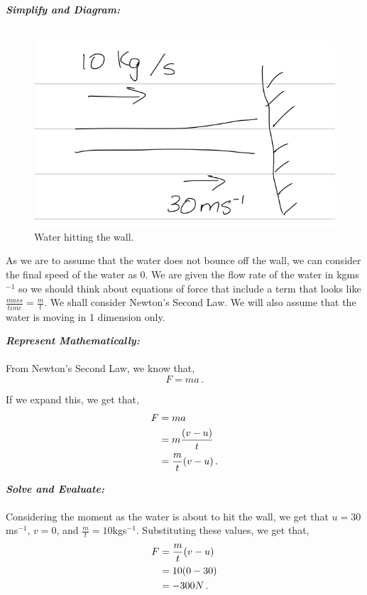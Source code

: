 \begin{subquestions}
\textbf{\textit{Simplify and Diagram:}} \\ \\
\begin{figure}[H]
	\begin{center}
		\includegraphics[scale=0.25]{../2015/figures/2015q6-1}
		\caption{\label{2015:q6:fig:Diagram1} Water hitting the wall.}
	\end{center}
\end{figure}	
As we are to assume that the water does not bounce off the wall, we can consider the final speed of the water as 0. We are given the flow rate of the water in kgms$^{-1}$ so we should think about equations of force that include a term that looks like $\frac{mass}{time}=\frac{m}{t}$. We shall consider Newton's Second Law. We will also assume that the water is moving in 1 dimension only.
	
	
	
	
\textbf{\textit{Represent Mathematically:}} \\ \\
From Newton's Second Law, we know that,
\begin{equation}
	F=ma \,.
\end{equation}
	
If we expand this, we get that,
\begin{align}
	F & = ma \nonumber \\
	  & = m\frac{(v-u)}{t} \nonumber \\
	  & = \frac{m}{t}(v-u) \,.
\end{align}
	
	
	
	
\textbf{\textit{Solve and Evaluate:}} \\ \\
Considering the moment as the water is about to hit the wall, we get that $u=30$ms$^{-1}$, $v=0$, and $\frac{m}{t}=10$kgs$^{-1}$. Substituting these values, we get that,
\begin{align}
	F & = \frac{m}{t}(v-u) \nonumber \\
	  & = 10(0-30) \nonumber \\
	  & = -300N \,.
\end{align}	
	

\end{subquestions}
